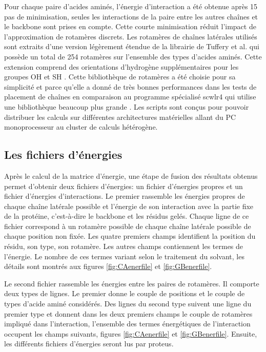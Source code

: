 Pour chaque paire d'acides aminés, l'énergie d'interaction a été obtenue après 15 pas de minimisation, seules les interactions de la paire entre les autres chaînes et le backbone sont prises en compte. Cette courte minimisation réduit l'impact de l'approximation de rotamères discrets. Les rotamères de chaînes latérales utilisés sont extraits d'une version légèrement étendue de la librairie de Tuffery et al. \cite{Tuffery91} qui possède un total de 254 rotamères sur l'ensemble des types d'acides aminés. Cette extension comprend des orientations d'hydrogène supplémentaires pour les groupes OH et SH \cite{Gaillard14}. Cette bibliothèque de rotamères a été choisie pour sa simplicité et parce qu'elle a donné de très bonnes performances dans les tests de placement de chaînes en comparaison au programme spécialisé scwlr4 qui utilise une bibliothèque beaucoup plus grande \cite{Krivov09,Gaillard16}. Les scripts sont conçus pour pouvoir distribuer les calculs sur différentes architectures matérielles allant du PC monoprocesseur au cluster de calculs hétérogène.

\subsection{Les fichiers d'énergies}

Après le calcul de la matrice d'énergie, une étape de fusion des résultats obtenus permet d'obtenir deux fichiers d'énergies: un fichier d'énergies propres et un fichier d'énergies d'interactions. Le premier rassemble les énergies propres de chaque chaîne latérale possible et l'énergie de son interaction avec la partie fixe de la protéine, c'est-à-dire le backbone et les résidus gelés. Chaque ligne de ce fichier correspond à un rotamère possible de chaque chaîne latérale possible de chaque position non fixée. Les quatre premiers champs identifient la position du résidu, son type, son rotamère. Les autres champs contiennent les termes de l'énergie. Le nombre de ces termes variant selon le traitement du solvant, les détails sont montrés aux figures \ref{fig:CAenerfile} et \ref{fig:GBenerfile}.   

Le second fichier rassemble les énergies entre les paires de rotamères. Il comporte deux types de lignes. Le premier donne le couple de positions et le couple de types d'acide aminé considérés. Des lignes du second type suivent une ligne du premier type et donnent dans les deux premiers champs le couple de rotamères impliqué dans l'interaction, l'ensemble des termes énergétiques de l'interaction occupent les champs suivants, figures \ref{fig:CAenerfile} et \ref{fig:GBenerfile}. Ensuite, les différents fichiers d'énergies seront lus par proteus. 

